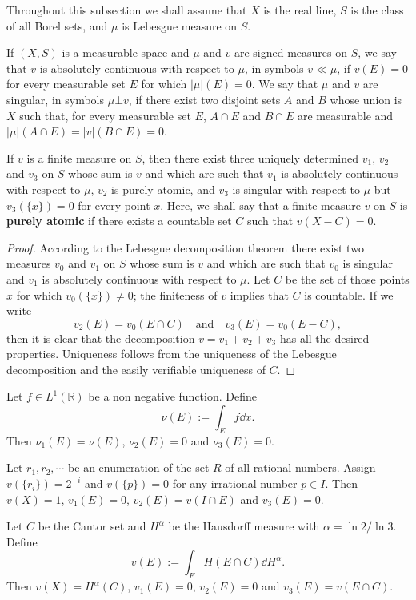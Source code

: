 Throughout this subsection we shall assume that $X$ is the real line, 
$S$ is the class of all Borel sets,
and $\mu$ is Lebesgue measure on $S$.

If $(X, S)$ is a measurable space and $\mu$ and $v$ are signed measures on $S$, 
we say that $v$ is absolutely continuous with respect to $\mu$,
in symbols $v \ll \mu$, if $v(E) = 0$ for every measurable set $E$ for which $|\mu|(E) = 0$.
We say that $\mu$ and $v$ are singular, in symbols $\mu \bot v$,
if there exist two disjoint sets $A$ and $B$ whose union is $X$ such that,
for every measurable set $E$, $A\cap E$ and $B\cap E$ are measurable and 
$|\mu|(A\cap E) = |v|(B\cap E) = 0$.


\begin{theorem}
  \label{thm: Lebesgue decomposition theorem}
  If $v$ is a finite measure on $S$, 
  then there exist three uniquely determined $v_1$, $v_2$ and $v_3$ on $S$
  whose sum is $v$ and which are such that $v_1$ is absolutely continuous with respect to $\mu$, 
  $v_2$ is purely atomic, 
  and $v_3$ is singular with respect to $\mu$ but $v_3(\{x\}) = 0$ for every point $x$.
  Here, we shall say that a finite measure $v$ on $S$ is \textbf{purely atomic} 
  if there exists a countable set $C$ such that $v(X-C) = 0$.
\end{theorem}

\begin{proof}
  According to the Lebesgue decomposition theorem there exist two measures $v_0$ and $v_1$ on $S$ 
  whose sum is $v$ and which are such that $v_0$ is singular 
  and $v_1$ is absolutely continuous with respect to $\mu$.
  Let $C$ be the set of those points $x$ for which $v_0(\{x\}) \neq 0$; the finiteness of $v$ implies that 
  $C$ is countable. If we write 
  \[
  v_2(E) = v_0(E\cap C) \quad \text{and}\quad v_3(E) = v_0(E-C),
  \]
  then it is clear that the decomposition $v = v_1 + v_2 + v_3$ has all the desired properties.
  Uniqueness follows from the uniqueness of the Lebesgue decomposition 
  and the easily verifiable uniqueness of $C$.
\end{proof}

\begin{example}
  Let $f\in L^1(\mathbb R)$ be a non negative function. 
  Define 
  \[
  \nu(E) := \int_Ef\dd x.
  \]
  Then $\nu_1(E) = \nu(E)$, $\nu_2(E) = 0$ and $\nu_3(E) = 0$.

  Let $r_1, r_2, \cdots$ be an enumeration of the set $R$ of all rational numbers. 
  Assign $v(\{r_i\}) = 2^{-i}$ and $v(\{p\}) = 0$ for any irrational number $p\in I$.
  Then $v(X) = 1$, $v_1(E) = 0$, $v_2(E) = v(I\cap E)$ and $v_3(E) = 0$.

  Let $C$ be the Cantor set and $H^{\alpha}$ be the Hausdorff measure with $\alpha=\ln 2/\ln3$.
  Define 
  \[
  v(E) := \int_E H(E\cap C)\dd H^\alpha.
  \]
  Then $v(X) = H^\alpha(C)$, $v_1(E) = 0$, $v_2(E) = 0$ and $v_3(E) = v(E\cap C)$.
\end{example}

